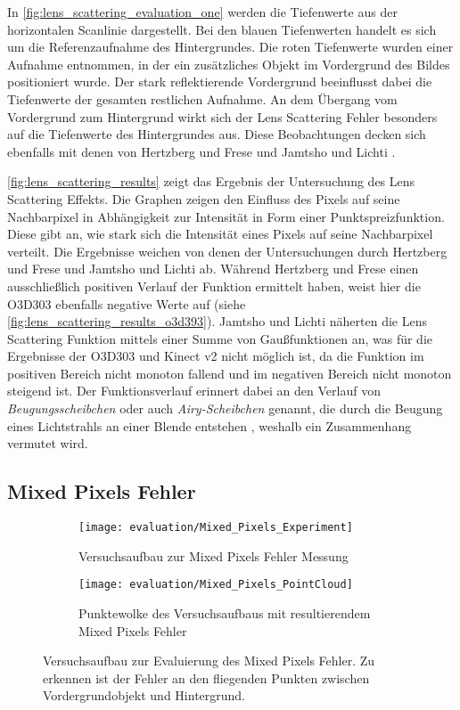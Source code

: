 \documentclass[thesis.tex]{subfiles}
\begin{document}
In \autoref{fig:lens_scattering_evaluation_one} werden die Tiefenwerte aus der horizontalen Scanlinie dargestellt. Bei den blauen Tiefenwerten handelt es sich um die Referenzaufnahme des Hintergrundes. Die roten Tiefenwerte wurden einer Aufnahme entnommen, in der ein zusätzliches Objekt im Vordergrund des Bildes positioniert wurde. Der stark reflektierende Vordergrund beeinflusst dabei die Tiefenwerte der gesamten restlichen Aufnahme. An dem Übergang vom Vordergrund zum Hintergrund wirkt sich der Lens Scattering Fehler besonders auf die Tiefenwerte des Hintergrundes aus. Diese Beobachtungen decken sich ebenfalls mit denen von Hertzberg und Frese \cite{bib:Hertzberg2014} und Jamtsho und Lichti \cite{bib:Jamtsho2010}.

\autoref{fig:lens_scattering_results} zeigt das Ergebnis der Untersuchung des Lens Scattering Effekts. Die Graphen zeigen den Einfluss des Pixels auf seine Nachbarpixel in Abhängigkeit zur Intensität in Form einer Punktspreizfunktion. Diese gibt an, wie stark sich die Intensität eines Pixels auf seine Nachbarpixel verteilt. Die Ergebnisse weichen von denen der Untersuchungen durch Hertzberg und Frese \cite{bib:Hertzberg2014} und Jamtsho und Lichti \cite{bib:Jamtsho2010} ab. Während Hertzberg und Frese einen ausschließlich positiven Verlauf der Funktion ermittelt haben, weist hier die O3D303 ebenfalls negative Werte auf (siehe \autoref{fig:lens_scattering_results_o3d393}). Jamtsho und Lichti näherten die Lens Scattering Funktion mittels einer Summe von Gaußfunktionen an, was für die Ergebnisse der O3D303 und Kinect v2 nicht möglich ist, da die Funktion im positiven Bereich nicht monoton fallend und im negativen Bereich nicht monoton steigend ist. Der Funktionsverlauf erinnert dabei an den Verlauf von \emph{Beugungsscheibchen} oder auch \emph{Airy-Scheibchen} genannt, die durch die Beugung eines Lichtstrahls an einer Blende entstehen \cite{bib:Padley2009}, weshalb ein Zusammenhang vermutet wird.
%
\subsection{Mixed Pixels Fehler}\label{sec:mixed_pixels}
%
\begin{figure}[h!]
\centering
\begin{subfigure}[b]{0.49\textwidth}\texttt{[image: evaluation/Mixed\_Pixels\_Experiment]}
    \caption{Versuchsaufbau zur Mixed Pixels Fehler Messung}
\end{subfigure}
\begin{subfigure}[b]{0.49\textwidth}\texttt{[image: evaluation/Mixed\_Pixels\_PointCloud]}
    \caption{Punktewolke des Versuchsaufbaus mit resultierendem Mixed Pixels Fehler}
\end{subfigure}
\caption{Versuchsaufbau zur Evaluierung des Mixed Pixels Fehler. Zu erkennen ist der Fehler an den fliegenden Punkten zwischen Vordergrundobjekt und Hintergrund.}
\label{fig:mixed_pixels_experiment}
\end{figure}
\end{document}
